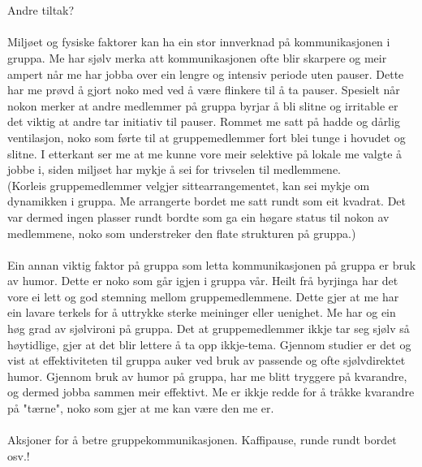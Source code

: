 \\
\\
Andre tiltak?
\\
\\
Miljøet og fysiske faktorer kan ha ein stor innverknad på kommunikasjonen i gruppa. Me har sjølv merka att kommunikasjonen ofte blir skarpere og meir ampert når me har jobba over ein lengre og intensiv periode uten pauser. Dette har me prøvd å gjort noko med ved å være flinkere til å ta pauser. Spesielt når nokon merker at andre medlemmer på gruppa byrjar å bli slitne og irritable er det viktig at andre tar initiativ til pauser. 
Rommet me satt på hadde og dårlig ventilasjon, noko som førte til at gruppemedlemmer fort blei tunge i hovudet og slitne. I etterkant ser me at me kunne vore meir selektive på lokale me valgte å jobbe i, siden miljøet har mykje å sei for trivselen til medlemmene.
\\
(Korleis gruppemedlemmer velgjer sittearrangementet, kan sei mykje om dynamikken i gruppa. Me arrangerte bordet me satt rundt som eit kvadrat. Det var dermed ingen plasser rundt bordte som ga ein høgare status til nokon av medlemmene, noko som understreker den flate strukturen på gruppa.)
\\
\\
Ein annan viktig faktor på gruppa som letta kommunikasjonen på gruppa er bruk av humor. Dette er noko som går igjen i gruppa vår. Heilt frå byrjinga har det vore ei lett og god stemning mellom gruppemedlemmene. Dette gjer at me har ein lavare terkels for å uttrykke sterke meininger eller uenighet. Me har og ein høg grad av sjølvironi på gruppa. Det at gruppemedlemmer ikkje tar seg sjølv så høytidlige, gjer at det blir lettere å ta opp ikkje-tema. Gjennom studier er det og vist at effektiviteten til gruppa auker ved bruk av passende og ofte sjølvdirektet humor. Gjennom bruk av humor på gruppa, har me blitt tryggere på kvarandre, og dermed jobba sammen meir effektivt. Me er ikkje redde for å tråkke kvarandre på "tærne", noko som gjer at me kan være den me er. 
\\
\\
Aksjoner for å betre gruppekommunikasjonen. Kaffipause, runde rundt bordet osv.!
